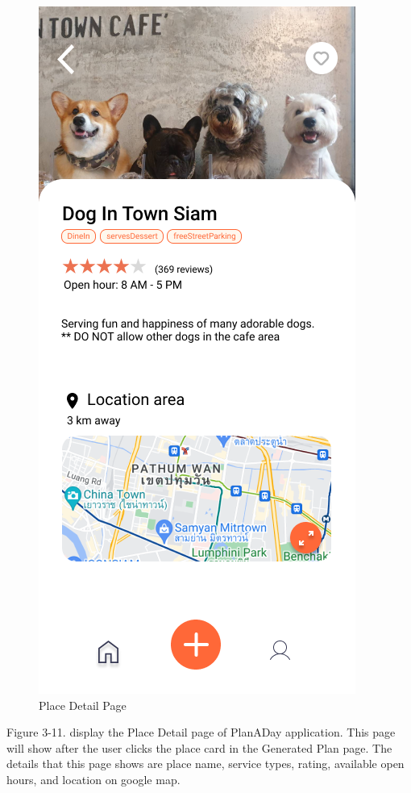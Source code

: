 \newpage
\begin{figure}[!h]
    \centering
    \includegraphics[width=0.5\linewidth]{chapter3/UI_Place_detail.png}
    \caption{Place Detail Page}
    \label{fig:Place Detail Page}
\end{figure}
\noindent
Figure 3-11. display the Place Detail page of PlanADay application. This page will
show after the user clicks the place card in the Generated Plan page. The details
that this page shows are place name, service types, rating, available open hours, and
location on google map.

